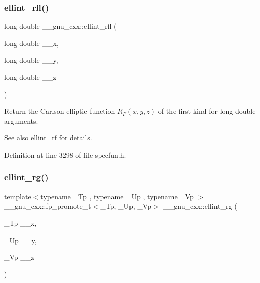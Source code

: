 \subsubsection{\texorpdfstring{ellint\+\_\+rfl()}{ellint\_rfl()}}
{\footnotesize\ttfamily long double \+\_\+\+\_\+gnu\+\_\+cxx\+::ellint\+\_\+rfl (\begin{DoxyParamCaption}\item[{long double}]{\+\_\+\+\_\+x,  }\item[{long double}]{\+\_\+\+\_\+y,  }\item[{long double}]{\+\_\+\+\_\+z }\end{DoxyParamCaption})\hspace{0.3cm}{\ttfamily [inline]}}

Return the Carlson elliptic function $ R_F(x,y,z) $ of the first kind for {\ttfamily long double} arguments.

\begin{DoxySeeAlso}{See also}
\hyperlink{group__mathsf__gnu_gae4859494464c7eaf98193f92b2235bc1}{ellint\+\_\+rf} for details. 
\end{DoxySeeAlso}


Definition at line 3298 of file specfun.\+h.

\mbox{\label{group__mathsf__gnu_gadf618529d6106c1c1bc1e9212c4fed12}} 
\subsubsection{\texorpdfstring{ellint\+\_\+rg()}{ellint\_rg()}}
{\footnotesize\ttfamily template$<$typename \+\_\+\+Tp , typename \+\_\+\+Up , typename \+\_\+\+Vp $>$ \\
\+\_\+\+\_\+gnu\+\_\+cxx\+::fp\+\_\+promote\+\_\+t$<$\+\_\+\+Tp, \+\_\+\+Up, \+\_\+\+Vp$>$ \+\_\+\+\_\+gnu\+\_\+cxx\+::ellint\+\_\+rg (\begin{DoxyParamCaption}\item[{\+\_\+\+Tp}]{\+\_\+\+\_\+x,  }\item[{\+\_\+\+Up}]{\+\_\+\+\_\+y,  }\item[{\+\_\+\+Vp}]{\+\_\+\+\_\+z }\end{DoxyParamCaption})\hspace{0.3cm}{\ttfamily [inline]}}

